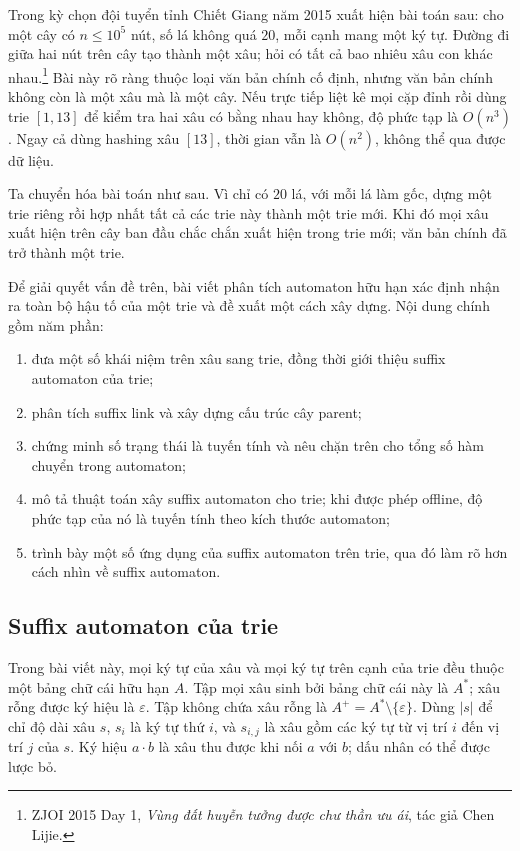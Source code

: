 \documentclass[11pt]{article}
\begin{document}
Trong kỳ chọn đội tuyển tỉnh Chiết Giang năm 2015 xuất hiện bài toán sau:
cho một cây có \(n\le 10^5\) nút, số lá không quá \(20\), mỗi cạnh mang một ký
tự. Đường đi giữa hai nút trên cây tạo thành một xâu; hỏi có tất cả bao nhiêu
xâu con khác nhau.\footnote{ZJOI 2015 Day 1, \emph{Vùng đất huyễn tưởng được
chư thần ưu ái}, tác giả Chen Lijie.} Bài này rõ ràng thuộc loại văn bản chính
cố định, nhưng văn bản chính không còn là một xâu mà là một cây. Nếu trực tiếp
liệt kê mọi cặp đỉnh rồi dùng trie \([1,13]\) để kiểm tra hai xâu có bằng nhau
hay không, độ phức tạp là \(O(n^3)\). Ngay cả dùng hashing xâu \([13]\), thời
gian vẫn là \(O(n^2)\), không thể qua được dữ liệu.

Ta chuyển hóa bài toán như sau. Vì chỉ có \(20\) lá, với mỗi lá làm gốc, dựng
một trie riêng rồi hợp nhất tất cả các trie này thành một trie mới. Khi đó mọi
xâu xuất hiện trên cây ban đầu chắc chắn xuất hiện trong trie mới; văn bản chính
đã trở thành một trie.

Để giải quyết vấn đề trên, bài viết phân tích automaton hữu hạn xác định nhận
ra toàn bộ hậu tố của một trie và đề xuất một cách xây dựng. Nội dung chính gồm
năm phần:
\begin{enumerate}
  \item đưa một số khái niệm trên xâu sang trie, đồng thời giới thiệu suffix
  automaton của trie;
  \item phân tích suffix link và xây dựng cấu trúc cây parent;
  \item chứng minh số trạng thái là tuyến tính và nêu chặn trên cho tổng số hàm
  chuyển trong automaton;
  \item mô tả thuật toán xây suffix automaton cho trie; khi được phép offline,
  độ phức tạp của nó là tuyến tính theo kích thước automaton;
  \item trình bày một số ứng dụng của suffix automaton trên trie, qua đó làm rõ
  hơn cách nhìn về suffix automaton.
\end{enumerate}

\subsection{Suffix automaton của trie}

Trong bài viết này, mọi ký tự của xâu và mọi ký tự trên cạnh của trie đều thuộc
một bảng chữ cái hữu hạn \(A\). Tập mọi xâu sinh bởi bảng chữ cái này là
\(A^*\); xâu rỗng được ký hiệu là \(\varepsilon\). Tập không chứa xâu rỗng là
\(A^+=A^*\setminus\{\varepsilon\}\). Dùng \(|s|\) để chỉ độ dài xâu \(s\),
\(s_i\) là ký tự thứ \(i\), và \(s_{i,j}\) là xâu gồm các ký tự từ vị trí \(i\)
đến vị trí \(j\) của \(s\). Ký hiệu \(a\cdot b\) là xâu thu được khi nối \(a\)
với \(b\); dấu nhân có thể được lược bỏ.
\end{document}
